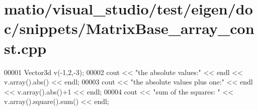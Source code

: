 \hypertarget{matio_2visual__studio_2test_2eigen_2doc_2snippets_2_matrix_base__array__const_8cpp_source}{}\section{matio/visual\+\_\+studio/test/eigen/doc/snippets/\+Matrix\+Base\+\_\+array\+\_\+const.cpp}
\label{matio_2visual__studio_2test_2eigen_2doc_2snippets_2_matrix_base__array__const_8cpp_source}

\begin{DoxyCode}
00001 Vector3d v(-1,2,-3);
00002 cout << \textcolor{stringliteral}{"the absolute values:"} << endl << v.array().abs() << endl;
00003 cout << \textcolor{stringliteral}{"the absolute values plus one:"} << endl << v.array().abs()+1 << endl;
00004 cout << \textcolor{stringliteral}{"sum of the squares: "} << v.array().square().sum() << endl;
\end{DoxyCode}
